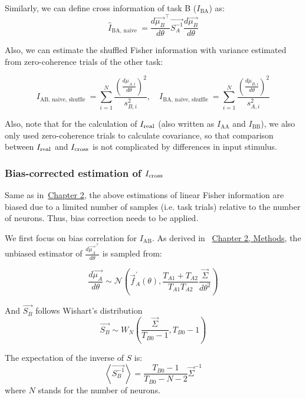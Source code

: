 \documentclass[lineno,pdflatex,sn-basic]{sn-jnl}%
\newcommand{\Ir}{I_{\rm real}} %
\newcommand{\Icross}{I_{\rm cross}}
\theoremstyle{thmstyleone}%
\theoremstyle{thmstyletwo}%
\theoremstyle{thmstylethree}%
\begin{document}
Similarly, we can define cross information of task B ($I_\textrm{BA}$) as:
\[\hat{I}_{\text {BA, naive }}=\frac{d \vec{\mu_B}^{\top}}{d \theta} \vec{S_A^{-1}} \frac{d \vec{\mu_B}}{d \theta}\]

Also, we can estimate the shuffled Fisher information with variance estimated from zero-coherence trials of the other task:

\[I_{\text {AB, naive, shuffle }}=  \sum_{i=1}^N \frac{\left(\frac{d\mu_{A,i}}{ d\theta}\right)^2}{s_{B,i}^2},
\quad
I_{\text {BA, naive, shuffle }}=  \sum_{i=1}^N \frac{\left(\frac{d\mu_{B,i}}{ d\theta}\right)^2}{s_{A,i}^2}\]


Also, note that for the calculation of $\Ir$ (also written as $I_\textrm{AA}$ and $I_\textrm{BB}$), we also only used zero-coherence trials to calculate covariance, so that comparison between $\Ir$ and $\Icross$ is not complicated by differences in input stimulus. 

\subsubsection{Bias-corrected estimation of $\Icross$} \label{sec_ch2:cross_fisher_bias_correction} Same as in~\hyperref[sec_ch1:supp_lisherfisherinfo]{Chapter 2}, the above estimations of linear Fisher information are biased due to a limited number of samples (i.e. task trials) relative to the number of neurons. Thus, bias correction needs to be applied. 

We first focus on bias correlation for $I_\textrm{AB}$. 
As derived in ~\hyperref[sec_ch1:supp_lisherfisherinfo]{Chapter 2, Methods}, the unbiased estimator of  $\frac{d \vec{\mu_A}^{\top}}{d \theta}$ is sampled from:

\begin{equation}
\frac{d\vec{\mu_A}}{d\theta} \sim \mathcal{N}\left(\vec{f}_A^{\prime}(\theta), \frac{T_{A1}+T_{A2}}{T_{A1} T_{A2}}  \frac{\vec{\Sigma}}{d \theta^2}\right)
\label{eq_dmu_A_sample}
\end{equation}

And $\vec{S_B}$ follows Wishart's distribution
\[\vec{S_B} \sim W_N\left(\frac{\vec{\Sigma}}{T_{B0} - 1} , T_{B0}-1\right)\]

The expectation of the inverse of $S$ is:
\begin{equation}
\left\langle \vec{S_B^{-1}}\right\rangle=\frac{T_{B0}-1}{T_{B0}-N-2} \vec{\Sigma}^{-1}
\label{eq_S_B_inverse_expectation}
\end{equation}
where $N$ stands for the number of neurons.
\end{document}
